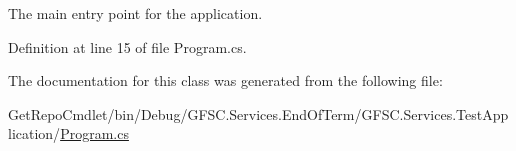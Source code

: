 The main entry point for the application. 



Definition at line 15 of file Program.\+cs.



The documentation for this class was generated from the following file\+:\begin{DoxyCompactItemize}
\item 
Get\+Repo\+Cmdlet/bin/\+Debug/\+G\+F\+S\+C.\+Services.\+End\+Of\+Term/\+G\+F\+S\+C.\+Services.\+Test\+Application/\mbox{\hyperlink{_program_8cs}{Program.\+cs}}\end{DoxyCompactItemize}
